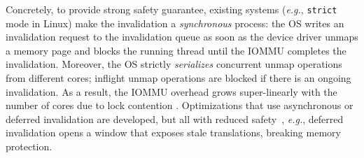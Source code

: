 Concretely, to provide strong safety guarantee, existing systems 
    (\textit{e.g.}, \texttt{strict} mode
    in Linux) make the invalidation 
    a {\it synchronous} process: the OS writes an invalidation request 
    to the invalidation queue 
    as soon as the device driver unmaps a memory page 
    and blocks the running thread until the IOMMU completes the invalidation.
Moreover, the OS strictly {\it serializes} concurrent 
    unmap operations from different cores; inflight unmap operations 
    are blocked if there is an ongoing invalidation.
As a result, the IOMMU overhead grows super-linearly with the number of cores 
    due to lock contention .
Optimizations that use asynchronous or deferred invalidation are developed, but all with 
    reduced safety~\cite{Amit2011vIOMMU}, \textit{e.g.}, deferred invalidation
    opens a window that exposes stale translations,
    breaking memory protection.



